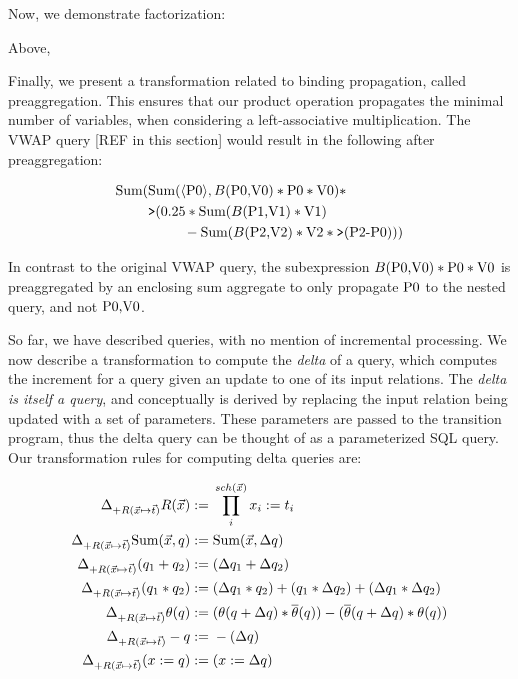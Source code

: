 {Now, we demonstrate factorization: 

Above, 

Finally, we present a transformation related to binding propagation, called
preaggregation. This ensures that our product operation propagates the minimal
number of variables, when considering a left-associative multiplication.
The VWAP query [REF in this section] would result in the following after
preaggregation:

\vspace{-3mm}
\begin{align*}
\mbox{Sum}(
& \mbox{Sum}({\langle\mbox{P0}\rangle}, B(\mbox{P0,V0}) * \mbox{P0} * \mbox{V0}) *\\
& \mbox{{\tt >}}(0.25 * \mbox{Sum}(B(\mbox{P1,V1}) * \mbox{V1}) \\
& \qquad \; \; - \mbox{Sum}(B(\mbox{P2,V2}) * \mbox{V2} * \mbox{{\tt >}}(\mbox{P2-P0})))
\end{align*}

\noindent In contrast to the original VWAP query, the subexpression
$B(\mbox{P0,V0}) * \mbox{P0} * \mbox{V0}$ is preaggregated by an enclosing sum aggregate
to only propagate $\mbox{P0}$ to the nested query, and not $\mbox{P0,V0}$.

So far, we have described queries, with no mention of incremental processing. We
now describe a transformation to compute the \textit{delta} of a query, which
computes the increment for a query given an update to one of its input
relations. The \textit{delta is itself a query}, and conceptually
is derived by replacing the input relation being updated with a set of
parameters. These parameters are passed to the transition program, thus the
delta query can be thought of as a parameterized SQL query. Our transformation
rules for computing delta queries are:

\vspace{-3mm}
\begin{align*}
\comment{
\Delta_{+R(\vec{x} \mapsto \vec{t})} c := & \; 0
\\
\Delta_{+R(\vec{x} \mapsto \vec{t})} Var(y) := & \; 0
\\
}
\Delta_{+R(\vec{x} \mapsto \vec{t})} R(\vec{x}) := & \;
\prod_i^{sch(\vec{x})} x_i := t_i
\\
\comment{
\Delta_{+R(\vec{x} \mapsto \vec{t})} S(\vec{y}) := & \; 0
\\
}
\Delta_{+R(\vec{x} \mapsto \vec{t})}
\calcsum(\vec{x},\q) := & \; \calcsum(\vec{x},\Delta\q)
\\
\Delta_{+R(\vec{x} \mapsto \vec{t})} (\qa + \qb) := & \;
(\Delta\qa + \Delta\qb)
\\
\Delta_{+R(\vec{x} \mapsto \vec{t})} (\qa * \qb) := & \;
(\Delta \qa * \qb) +
(\qa * \Delta \qb) +
(\Delta \qa * \Delta \qb)
\\
\Delta_{+R(\vec{x} \mapsto \vec{t})} \theta(\q) := & \;
(\theta(\q + \Delta \q) * \overline{\theta}(\q)) -
(\overline{\theta}(\q+\Delta \q) * \theta(\q))
\\
\Delta_{+R(\vec{x} \mapsto \vec{t})} -\q := & \;
    -(\Delta \q)
\\
\Delta_{+R(\vec{x} \mapsto \vec{t})} (x := \q) := & \;
    (x := \Delta \q)
\end{align*}

}
